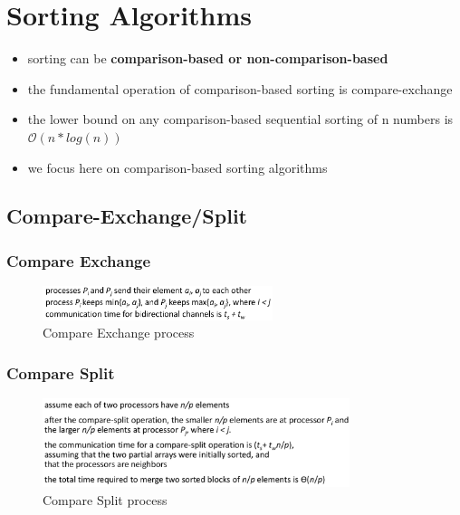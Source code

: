 \hypertarget{sorting-algorithms}{%
\section{Sorting Algorithms}\label{sorting-algorithms}}

\begin{itemize}
\tightlist
\item
  sorting can be \textbf{comparison-based or non-comparison-based}
\item
  the fundamental operation of comparison-based sorting is
  compare-exchange
\item
  the lower bound on any comparison-based sequential sorting of n
  numbers is $\mathcal{O}(n * log (n))$
\item
  we focus here on comparison-based sorting algorithms
\end{itemize}

\hypertarget{compare-exchangesplit}{%
\subsection{Compare-Exchange/Split}\label{compare-exchangesplit}}

\hypertarget{compare-exchange}{%
\subsubsection{Compare Exchange}\label{compare-exchange}}

\begin{figure}[H]
\centering
\includegraphics[width=0.6\textwidth]{figures/compareExchange.png}
\caption{Compare Exchange process}
\end{figure}

\hypertarget{compare-split}{%
\subsubsection{Compare Split}\label{compare-split}}

\begin{figure}[H]
\centering
\includegraphics[width=0.8\textwidth]{figures/comparesplit.png}
\caption{Compare Split process}
\end{figure}

